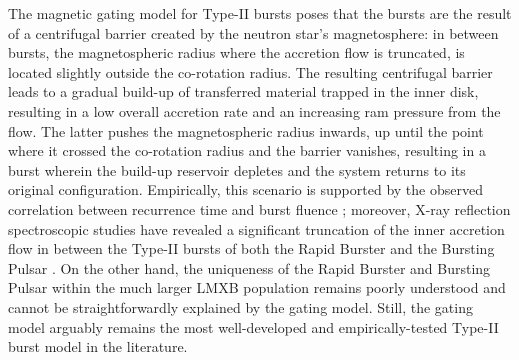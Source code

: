 \documentclass[fleqn,usenatbib]{mnras}
\begin{document}
The magnetic gating model for Type-II bursts \citep{spruit1993,dangelo2010} poses that the bursts are the result of a centrifugal barrier created by the neutron star's magnetosphere: in between bursts, the magnetospheric radius where the accretion flow is truncated, is located slightly outside the co-rotation radius. The resulting centrifugal barrier leads to a gradual build-up of transferred material trapped in the inner disk, resulting in a low overall accretion rate and an increasing ram pressure from the flow. The latter pushes the magnetospheric radius inwards, up until the point where it crossed the co-rotation radius and the barrier vanishes, resulting in a burst wherein the build-up reservoir depletes and the system returns to its original configuration. Empirically, this scenario is supported by the observed correlation between recurrence time and burst fluence \citep{bagnoli2015}; moreover, X-ray reflection spectroscopic studies have revealed a significant truncation of the inner accretion flow in between the Type-II bursts of both the Rapid Burster and the Bursting Pulsar \citep{degenaar2014,vandeneijnden2017}. On the other hand, the uniqueness of the Rapid Burster and Bursting Pulsar within the much larger LMXB population remains poorly understood and cannot be straightforwardly explained by the gating model. Still, the gating model arguably remains the most well-developed and empirically-tested Type-II burst model in the literature. 
\end{document}

